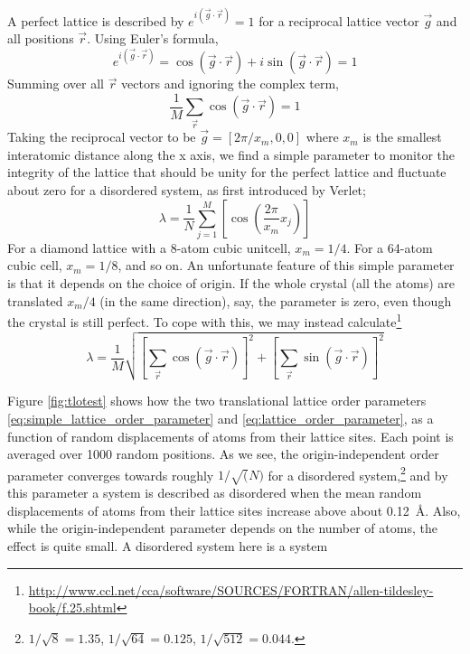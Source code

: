 \documentclass[11pt,bibliography=totoc,index=totoc]{scrbook}   %
\begin{document}
A perfect lattice is described by $e^{i(\vec{g}\cdot\vec{r})}=1$ for a reciprocal lattice vector $\vec{g}$ and all positions $\vec{r}$. 
Using Euler's formula,
\begin{equation}
    e^{i(\vec{g}\cdot\vec{r})} = \cos(\vec{g}\cdot\vec{r}) + i\sin(\vec{g}\cdot\vec{r}) = 1
\end{equation}
Summing over all $\vec{r}$ vectors and ignoring the complex term,
\begin{equation}
    \frac{1}{M}\sum_{\vec{r}} \cos(\vec{g}\cdot\vec{r}) = 1
\end{equation}
Taking the reciprocal vector to be $\vec{g}=[2\pi/x_m,0,0]$ where $x_m$ is the smallest interatomic distance along the x axis, we find a simple parameter to monitor the integrity of the lattice that should be unity for the perfect lattice and fluctuate about zero for a disordered system, as first introduced by Verlet;
\begin{equation}
  \lambda = \frac{1}{N} \sum_{j=1}^M  \left[ \cos\left( \frac{2\pi}{x_m} x_j \right)\right]
  \label{eq:simple_lattice_order_parameter}
\end{equation}
For a diamond lattice with a 8-atom cubic unitcell, $x_m=1/4$. For a 64-atom cubic cell, $x_m=1/8$, and so on.
An unfortunate feature of this simple parameter is that it depends on the choice of origin. 
If the whole crystal (all the atoms) are translated $x_m/4$ (in the same direction), say, the parameter is zero, even though the crystal is still perfect.
To cope with this, we may instead calculate\footnote{\url{http://www.ccl.net/cca/software/SOURCES/FORTRAN/allen-tildesley-book/f.25.shtml}}
\begin{equation}
  \lambda = \frac{1}{M}\sqrt{\left[\sum_{\vec{r}}\cos(\vec{g}\cdot\vec{r})\right]^2 + \left[\sum_{\vec{r}}\sin(\vec{g}\cdot\vec{r})\right]^2}
  \label{eq:lattice_order_parameter}
\end{equation}

Figure \ref{fig:tlotest} shows how the two translational lattice order parameters \eqref{eq:simple_lattice_order_parameter} and \eqref{eq:lattice_order_parameter}, as a function of random displacements of atoms from their lattice sites. Each point is averaged over 1000 random positions. 
As we see, the origin-independent order parameter converges towards roughly $1/\sqrt(N)$ for a disordered system,\footnote{$1/\sqrt{8}=1.35$, $1/\sqrt{64}=0.125$, $1/\sqrt{512}=0.044$.}
and by this parameter a system is described as disordered when the mean random displacements of atoms from their lattice sites increase above about 0.12~Å.
Also, while the origin-independent parameter depends on the number of atoms, the effect is quite small.
A disordered system here is a system 
\end{document}
